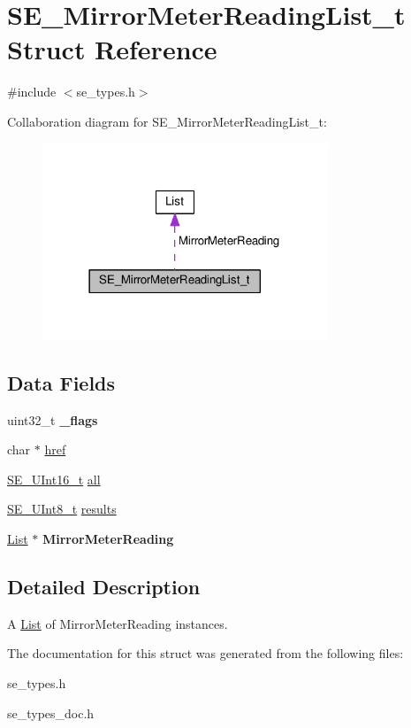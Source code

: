 \hypertarget{structSE__MirrorMeterReadingList__t}{}\section{S\+E\+\_\+\+Mirror\+Meter\+Reading\+List\+\_\+t Struct Reference}
\label{structSE__MirrorMeterReadingList__t}


{\ttfamily \#include $<$se\+\_\+types.\+h$>$}



Collaboration diagram for S\+E\+\_\+\+Mirror\+Meter\+Reading\+List\+\_\+t\+:\nopagebreak
\begin{figure}[H]
\begin{center}
\leavevmode
\includegraphics[width=242pt]{structSE__MirrorMeterReadingList__t__coll__graph}
\end{center}
\end{figure}
\subsection*{Data Fields}
\begin{DoxyCompactItemize}
\item 
uint32\+\_\+t {\bfseries \+\_\+flags}
\item 
char $\ast$ \hyperlink{group__MirrorMeterReadingList_gaefefadeff8d43344a34648716b272105}{href}
\item 
\hyperlink{group__UInt16_gac68d541f189538bfd30cfaa712d20d29}{S\+E\+\_\+\+U\+Int16\+\_\+t} \hyperlink{group__MirrorMeterReadingList_ga2dcd78e43b71829805f181a0749ea9ab}{all}
\item 
\hyperlink{group__UInt8_gaf7c365a1acfe204e3a67c16ed44572f5}{S\+E\+\_\+\+U\+Int8\+\_\+t} \hyperlink{group__MirrorMeterReadingList_ga06c065033d62755a9f1ab755638771f6}{results}
\item 
\hyperlink{structList}{List} $\ast$ {\bfseries Mirror\+Meter\+Reading}
\end{DoxyCompactItemize}


\subsection{Detailed Description}
A \hyperlink{structList}{List} of Mirror\+Meter\+Reading instances. 

The documentation for this struct was generated from the following files\+:\begin{DoxyCompactItemize}
\item 
se\+\_\+types.\+h\item 
se\+\_\+types\+\_\+doc.\+h\end{DoxyCompactItemize}
